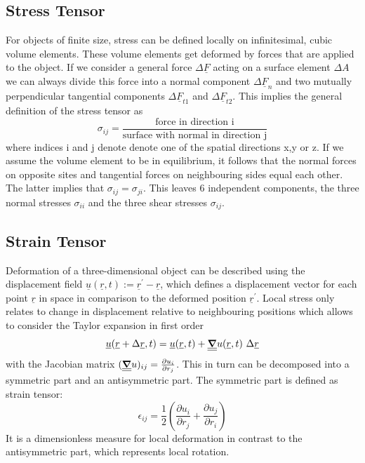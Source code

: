 \subsection{Stress Tensor}
For objects of finite size, stress can be defined locally on
infinitesimal, cubic volume elements. These volume elements get deformed by
forces that are applied to the object. If we consider a general force
$\Delta \underline{F}$ acting on a surface element $\Delta A$ we can always
divide
this force into a normal component $\Delta \underline{F}_n$ and two mutually
perpendicular tangential components $\Delta \underline{F}_{t1}$ and
$\Delta \underline{F}_{t2}$. This implies the general definition of the stress
tensor
as
\begin{equation}
    \sigma_{ij} = \frac{\text{force in direction i}}{\text{surface with normal
            in direction j}}
\end{equation}
where indices i and j denote denote one of the spatial directions x,y or z.
If we assume the volume element to be in equilibrium, it follows that the
normal forces on opposite sites and tangential forces on neighbouring sides
equal each other.
The latter implies that $\sigma_{ij}=\sigma_{ji}$. This leaves 6
independent components, the three normal stresses $\sigma_{ii}$ and the three
shear stresses $\sigma_{ij}$.

\subsection{Strain Tensor}
Deformation of a three-dimensional object can be described using the
displacement field $\underline{u}(\underline{r}, t):=
    \underline{r}^\prime-\underline{r}$,
which defines a displacement vector for each point $\underline{r}$ in space in
comparison to the deformed position $\underline{r}^\prime$. Local stress only
relates to change in displacement relative to neighbouring positions which
allows to consider the Taylor expansion in first order
\begin{equation}
    \underline{u}(\underline{r}+\Delta\underline{r}, t)
    = \underline{u}(\underline{r}, t) +
    \underline{\underline{\gradient}}u(\underline{r}, t)\ \Delta \underline{r}
\end{equation}
with the Jacobian matrix $(\underline{\underline{\gradient}}u )_{ij} =
    \frac{\partial u_i}{\partial r_j}$. This in turn can be decomposed into a
symmetric part and an antisymmetric part. The symmetric part is defined as
strain tensor:
\begin{equation} \label{eq:defstrain}
    \epsilon_{ij} = \frac{1}{2} \left(	 \frac{\partial u_i}{\partial r_j}
    +\frac{\partial u_j}{\partial r_i} \right)
\end{equation}
It is a dimensionless measure for local deformation in contrast to the
antisymmetric part, which represents local rotation.

